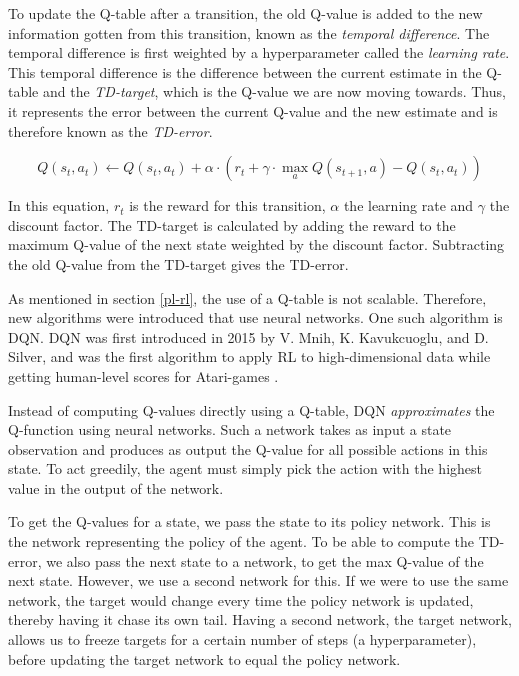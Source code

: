 To update the Q-table after a transition, the old Q-value is added to the new information gotten from this transition, known as the \emph{temporal difference}. The temporal difference is first weighted by a hyperparameter called the \emph{learning rate}. This temporal difference is the difference between the current estimate in the Q-table and the \emph{TD-target}, which is the Q-value we are now moving towards. Thus, it represents the error between the current Q-value and the new estimate and is therefore known as the \emph{TD-error}.

\begin{equation}
Q(s_t,a_t) \leftarrow Q(s_t,a_t) + \alpha \cdot (r_t + \gamma \cdot \max _{a} Q(s_{t+1},a) - Q(s_t,a_t))
\end{equation}

In this equation, $r_t$ is the reward for this transition, $\alpha$ the learning rate and $\gamma$ the discount factor. The TD-target is calculated by adding the reward to the maximum Q-value of the next state weighted by the discount factor. Subtracting the old Q-value from the TD-target gives the TD-error. 

As mentioned in section \ref{pl-rl}, the use of a Q-table is not scalable. Therefore, new algorithms were introduced that use neural networks. One such algorithm is DQN. DQN was first introduced in 2015 by V. Mnih, K. Kavukcuoglu, and D. Silver, and was the first algorithm to apply RL to high-dimensional data while getting human-level scores for Atari-games \cite{dqn}.

Instead of computing Q-values directly using a Q-table, DQN \emph{approximates} the Q-function using neural networks. Such a network takes as input a state observation and produces as output the Q-value for all possible actions in this state. To act greedily, the agent must simply pick the action with the highest value in the output of the network.

To get the Q-values for a state, we pass the state to its policy network. This is the network representing the policy of the agent. To be able to compute the TD-error, we also pass the next state to a network, to get the max Q-value of the next state. However, we use a second network for this. If we were to use the same network, the target would change every time the policy network is updated, thereby having it chase its own tail. Having a second network, the target network, allows us to freeze targets for a certain number of steps (a hyperparameter), before updating the target network to equal the policy network.

